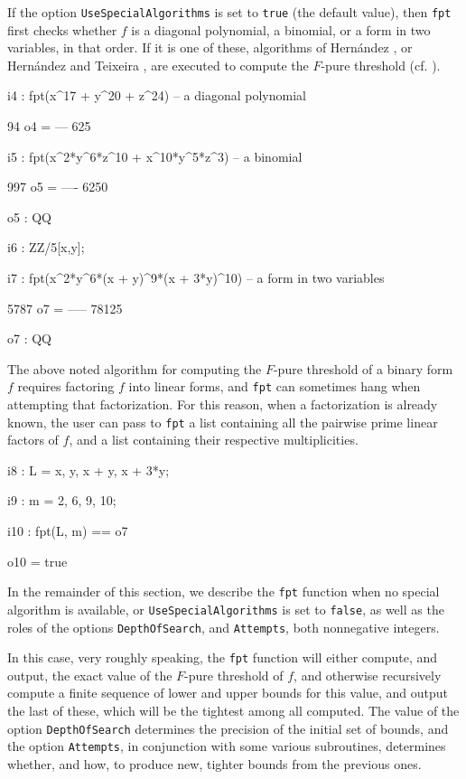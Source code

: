 \documentclass{amsart}
\begin{document}
If the option {\tt UseSpecialAlgorithms} is set to {\tt true} (the default value), then {\tt fpt} first checks whether $f$ is a diagonal polynomial, a binomial, or a form in two variables, in that order.
If it is one of these, algorithms of Hern\'andez \cite{HernandezFInvariantsOfDiagonalHyp, HernandezFPureThresholdOfBinomial}, or Hern\'andez and Teixeira \cite{HernandezTeixeiraFThresholdFunctions},  are executed to compute the $F$-pure threshold (cf. \cite{ShibutaTakagiLCThresholds}).

{\small
{}
\begin{MyVerbatim}

i4 : fpt(x^17 + y^20 + z^24) -- a diagonal polynomial

      94
o4 = ---
     625

i5 : fpt(x^2*y^6*z^10 + x^10*y^5*z^3) -- a binomial

      997
o5 = ----
     6250

o5 : QQ

i6 : ZZ/5[x,y];

i7 : fpt(x^2*y^6*(x + y)^9*(x + 3*y)^10) -- a form in two variables

      5787
o7 = -----
     78125

o7 : QQ
\end{MyVerbatim}
}
\medspace

The above noted algorithm for computing the $F$-pure threshold of a binary form $f$ requires factoring $f$ into linear forms, and {\tt fpt} can sometimes hang when attempting that factorization. For this reason, when a factorization is already known, the user can pass to {\tt fpt} a list containing all the pairwise prime linear factors of $f$, and a list containing their respective multiplicities.

{\small
{}
\begin{MyVerbatim}

i8 : L = {x, y, x + y, x + 3*y};

i9 : m = {2, 6, 9, 10};

i10 : fpt(L, m) == o7

o10 = true
\end{MyVerbatim}
}
\medspace

In the remainder of this section, we describe the {\tt fpt} function when no special algorithm is available, or {\tt UseSpecialAlgorithms} is set to {\tt false},  as well as the roles of the options {\tt DepthOfSearch}, and {\tt Attempts}, both nonnegative integers.

In this case, very roughly speaking, the {\tt fpt} function will either compute, and output, the exact value of the $F$-pure threshold of $f$, and otherwise recursively compute a finite sequence of lower and upper bounds for this value, and output the last of these, which will be the tightest among all computed.  The value of the option {\tt DepthOfSearch} determines the precision of the initial set of bounds, and the option {\tt Attempts}, in conjunction with some various subroutines, determines whether, and how, to produce new, tighter bounds from the previous ones.
\end{document}
